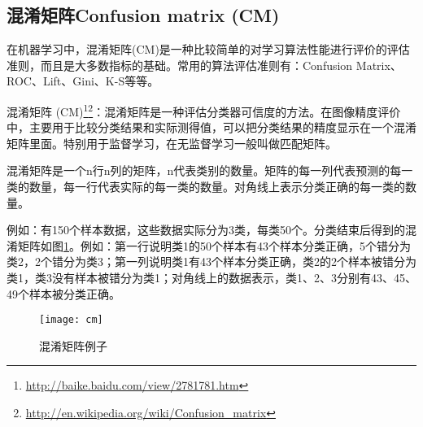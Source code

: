 \subsection{混淆矩阵Confusion matrix (CM)}
\label{CM}

在机器学习中，混淆矩阵(CM)是一种比较简单的对学习算法性能进行评价的评估准则，而且是大多数指标的基础。常用的算法评估准则有：Confusion Matrix、ROC、Lift、Gini、K-S等等。\newline

混淆矩阵 (CM)\footnote{\url{http://baike.baidu.com/view/2781781.htm}}\footnote{\url{http://en.wikipedia.org/wiki/Confusion_matrix}}：混淆矩阵是一种评估分类器可信度的方法。在图像精度评价中，主要用于比较分类结果和实际测得值，可以把分类结果的精度显示在一个混淆矩阵里面。特别用于监督学习，在无监督学习一般叫做匹配矩阵。

混淆矩阵是一个n行n列的矩阵，n代表类别的数量。矩阵的每一列代表预测的每一类的数量，每一行代表实际的每一类的数量。对角线上表示分类正确的每一类的数量。

例如：有150个样本数据，这些数据实际分为3类，每类50个。分类结束后得到的混淆矩阵如图\ref{fig:cm}。例如：第一行说明类1的50个样本有43个样本分类正确，5个错分为类2，2个错分为类3；第一列说明类1有43个样本分类正确，类2的2个样本被错分为类1，类3没有样本被错分为类1；对角线上的数据表示，类1、2、3分别有43、45、49个样本被分类正确。\newline
    \begin{figure}[!ht]
      \centering 
        \texttt{[image: cm]}
        \caption{混淆矩阵例子}
        \label{fig:cm}
    \end{figure}

